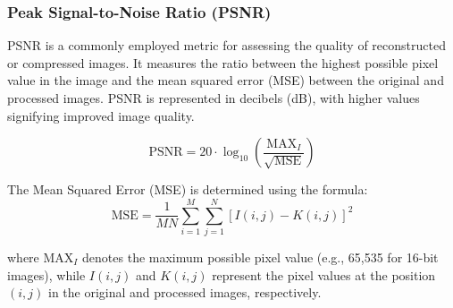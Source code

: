 \documentclass[conference]{IEEEtran}
\begin{document}
\subsubsection{Peak Signal-to-Noise Ratio (PSNR)}
PSNR is a commonly employed metric for assessing the quality of reconstructed or compressed images. It measures the ratio between the highest possible pixel value in the image and the mean squared error (MSE) between the original and processed images. PSNR is represented in decibels (dB), with higher values signifying improved image quality.

\begin{equation}
\text{PSNR} = 20 \cdot \log_{10}\left(\frac{\text{MAX}_{I}}{\sqrt{\text{MSE}}}\right)
\end{equation}

The Mean Squared Error (MSE) is determined using the formula:
\begin{equation}
\text{MSE} = \frac{1}{MN} \sum_{i=1}^{M} \sum_{j=1}^{N} \left[I(i,j) - K(i,j)\right]^2
\end{equation}

where \(\text{MAX}_{I}\) denotes the maximum possible pixel value (e.g., 65,535 for 16-bit images), while \(I(i,j)\) and \(K(i,j)\) represent the pixel values at the position \((i,j)\) in the original and processed images, respectively.

\begin{table}[H]
    \caption{PSNR Error Analysis of Various Sample Images}
    \centering
    \renewcommand{\arraystretch}{1.8} %
    \label{tab:psnr_error_analysis}
\end{table}
\end{document}
